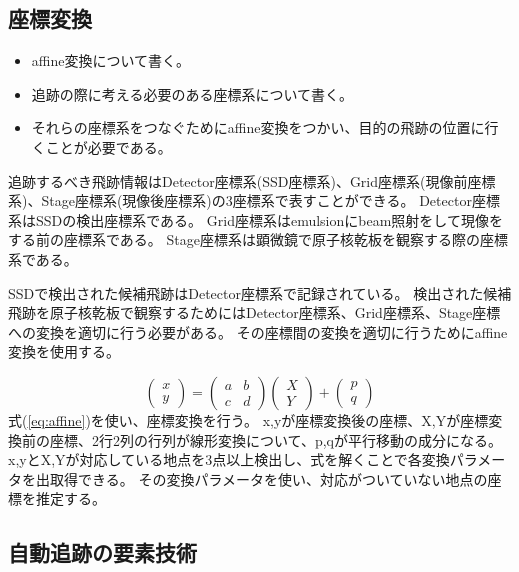 \documentclass[12pt,a4paper]{jarticle}
\begin{document}
\subsection{座標変換}
\begin{itemize}
    \item affine変換について書く。
    \item 追跡の際に考える必要のある座標系について書く。
    \item それらの座標系をつなぐためにaffine変換をつかい、目的の飛跡の位置に行くことが必要である。
\end{itemize}
追跡するべき飛跡情報はDetector座標系(SSD座標系)、Grid座標系(現像前座標系)、Stage座標系(現像後座標系)の3座標系で表すことができる。
Detector座標系はSSDの検出座標系である。
Grid座標系はemulsionにbeam照射をして現像をする前の座標系である。
Stage座標系は顕微鏡で原子核乾板を観察する際の座標系である。
\par
SSDで検出された候補飛跡はDetector座標系で記録されている。
検出された候補飛跡を原子核乾板で観察するためにはDetector座標系、Grid座標系、Stage座標への変換を適切に行う必要がある。
その座標間の変換を適切に行うためにaffine変換を使用する。
\par
\begin{equation}
  \left(
    \begin{array}{c}
    x \\
    y
    \end{array}
  \right)
  =
  \left(
    \begin{array}{cc}
      a & b \\
      c & d
    \end{array}
  \right)
  \left(
    \begin{array}{c}
      X \\
      Y
    \end{array}
  \right)
  +
  \left(
    \begin{array}{c}
      p \\
      q
    \end{array}
  \right)
\label{eq:affine}
\end{equation}
式(\ref{eq:affine})を使い、座標変換を行う。
x,yが座標変換後の座標、X,Yが座標変換前の座標、2行2列の行列が線形変換について、p,qが平行移動の成分になる。
x,yとX,Yが対応している地点を3点以上検出し、式を解くことで各変換パラメータを出取得できる。
その変換パラメータを使い、対応がついていない地点の座標を推定する。
\subsection{自動追跡の要素技術}
\end{document}
